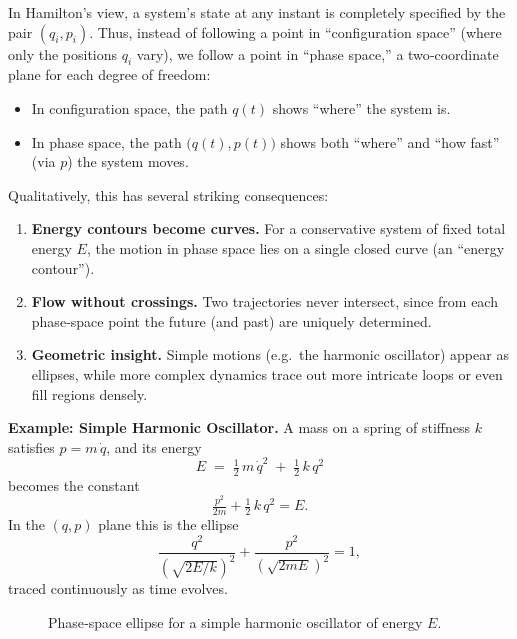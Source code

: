 In Hamilton’s view, a system’s state at any instant is completely specified by the pair \((q_i,p_i)\).  Thus, instead of following a point in “configuration space” (where only the positions \(q_i\) vary), we follow a point in “phase space,” a two‐coordinate plane for each degree of freedom:

\begin{itemize}
  \item In configuration space, the path \(q(t)\) shows “where” the system is.
  \item In phase space, the path \(\bigl(q(t),p(t)\bigr)\) shows both “where” and “how fast” (via \(p\)) the system moves.
\end{itemize}

Qualitatively, this has several striking consequences:

\begin{enumerate}
  \item {\bf Energy contours become curves.}  For a conservative system of fixed total energy \(E\), the motion in phase space lies on a single closed curve (an “energy contour”).  
  \item {\bf Flow without crossings.}  Two trajectories never intersect, since from each phase‐space point the future (and past) are uniquely determined.
  \item {\bf Geometric insight.}  Simple motions (e.g.\ the harmonic oscillator) appear as ellipses, while more complex dynamics trace out more intricate loops or even fill regions densely.
\end{enumerate}

\medskip
\noindent\textbf{Example: Simple Harmonic Oscillator.}  
A mass on a spring of stiffness \(k\) satisfies \(p=m\,\dot q\), and its energy 
\[
E \;=\; \tfrac12\,m\,\dot q^2 \;+\;\tfrac12\,k\,q^2
\]
becomes the constant
\[
\tfrac{p^2}{2m} + \tfrac12\,k\,q^2 = E.
\]
In the \((q,p)\) plane this is the ellipse
\[
\frac{q^2}{( \sqrt{2E/k} )^2} + \frac{p^2}{( \sqrt{2mE} )^2} = 1,
\]
traced continuously as time evolves.

\begin{figure}[H]
\centering
{}
\caption{Phase‐space ellipse for a simple harmonic oscillator of energy \(E\).}
\end{figure}

